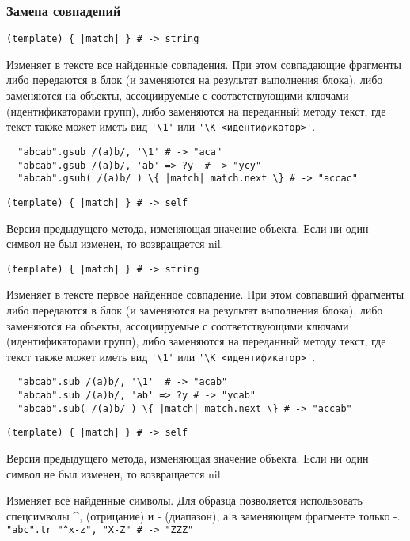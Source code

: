 \subsubsection*{Замена совпадений}

\begin{methodlist}
  \verb!(template) { |match| } # -> string!

  Изменяет в тексте все найденные совпадения. При этом совпадающие фрагменты либо передаются в блок (и заменяются на результат выполнения блока), либо заменяются на объекты, ассоциируемые с соответствующими ключами (идентификаторами групп), либо заменяются на переданный методу текст, где текст также может иметь вид \verb!'\1'! или \verb!'\K <идентификатор>'!.
  \begin{verbatim}
  "abcab".gsub /(a)b/, '\1' # -> "aca"
  "abcab".gsub /(a)b/, 'ab' => ?y  # -> "ycy"
  "abcab".gsub( /(a)b/ ) \{ |match| match.next \} # -> "accac"
  \end{verbatim}

  \verb!(template) { |match| } # -> self!

  Версия предыдущего метода, изменяющая значение объекта. Если ни один символ не был изменен, то возвращается nil.

  \verb!(template) { |match| } # -> string!

  Изменяет в тексте первое найденное совпадение. При этом совпавший фрагменты либо передаются в блок (и заменяются на результат выполнения блока), либо заменяются на объекты, ассоциируемые с соответствующими ключами (идентификаторами групп), либо заменяются на переданный методу текст, где текст также может иметь вид \verb!'\1'! или \verb!'\K <идентификатор>'!.
  \begin{verbatim}
  "abcab".sub /(a)b/, '\1'  # -> "acab"
  "abcab".sub /(a)b/, 'ab' => ?y # -> "ycab"
  "abcab".sub( /(a)b/ ) \{ |match| match.next \} # -> "accab"
  \end{verbatim}

  \verb!(template) { |match| } # -> self!

  Версия предыдущего метода, изменяющая значение объекта. Если ни один символ не был изменен, то возвращается nil.

  Изменяет все найденные символы. Для образца позволяется использовать спецсимволы \textasciicircum\-, (отрицание) и - (диапазон), а в заменяющем фрагменте только -.
  \\\verb!"abc".tr "^x-z", "X-Z" # -> "ZZZ"!


\end{methodlist}
